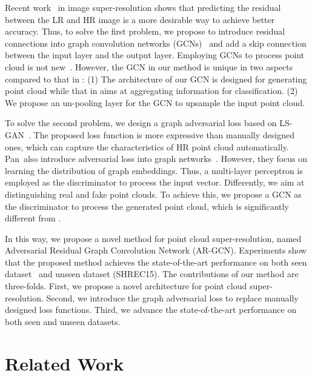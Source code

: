 \documentclass[10pt,twocolumn,letterpaper]{article}
\begin{document}
Recent work~\cite{kim2016deeply} in image super-resolution shows that predicting the residual between the LR and HR image is a more desirable way to achieve better accuracy.
Thus, to solve the first problem, we propose to introduce residual connections into graph convolution networks (GCNs)~\cite{defferrard2016convolutional} and add a skip connection between the input layer and the output layer.
Employing GCNs to process point cloud is not new~\cite{zhang2018graph}.
However, the GCN in our method is unique in two aspects compared to that in \cite{zhang2018graph}: (1) The architecture of our GCN is designed for generating point cloud while that in \cite{zhang2018graph} aims at aggregating information for classification. (2) We propose an un-pooling layer for the GCN to upsample the input point cloud.

To solve the second problem, we design a graph adversarial loss based on LS-GAN~\cite{mao2017least}.
The proposed loss function is more expressive than manually designed ones, which can capture the characteristics of HR point cloud automatically.
Pan~\etal also introduce adversarial loss into graph networks~\cite{Pan2018AdversariallyRG}.
However, they focus on learning the distribution of graph embeddings.
Thus, a multi-layer perceptron is employed as the discriminator to process the input vector.
Differently, we aim at distinguishing real and fake point clouds.
To achieve this, we propose a GCN as the discriminator to process the generated point cloud, which is significantly different from \cite{Pan2018AdversariallyRG}.

In this way, we propose a novel method for point cloud super-resolution, named Adversarial Residual Graph Convolution Network (AR-GCN).
Experiments show that the proposed method achieves the state-of-the-art performance on both seen dataset~\cite{yu2018pu} and unseen dataset (SHREC15).
The contributions of our method are three-folds.
First, we propose a novel architecture for point cloud super-resolution.
Second, we introduce the graph adversarial loss to replace manually designed loss functions.
Third, we advance the state-of-the-art performance on both seen and unseen datasets.

\section{Related Work}
\end{document}
